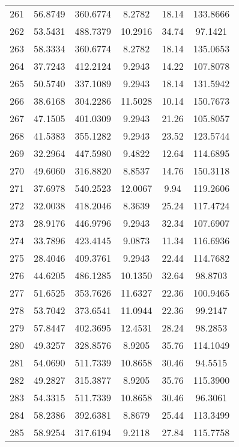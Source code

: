 \begin{center}
\begin{footnotesize}
\begin{tabular}{|c|ccccc|}
261 & 56.8749 & 360.6774 & 8.2782 & 18.14 & 133.8666 \\
262 & 53.5431 & 488.7379 & 10.2916 & 34.74 & 97.1421 \\
263 & 58.3334 & 360.6774 & 8.2782 & 18.14 & 135.0653 \\
264 & 37.7243 & 412.2124 & 9.2943 & 14.22 & 107.8078 \\
265 & 50.5740 & 337.1089 & 9.2943 & 18.14 & 131.5942 \\
266 & 38.6168 & 304.2286 & 11.5028 & 10.14 & 150.7673 \\
267 & 47.1505 & 401.0309 & 9.2943 & 21.26 & 105.8057 \\
268 & 41.5383 & 355.1282 & 9.2943 & 23.52 & 123.5744 \\
269 & 32.2964 & 447.5980 & 9.4822 & 12.64 & 114.6895 \\
270 & 49.6060 & 316.8820 & 8.8537 & 14.76 & 150.3118 \\
271 & 37.6978 & 540.2523 & 12.0067 & 9.94 & 119.2606 \\
272 & 32.0038 & 418.2046 & 8.3639 & 25.24 & 117.4724 \\
273 & 28.9176 & 446.9796 & 9.2943 & 32.34 & 107.6907 \\
274 & 33.7896 & 423.4145 & 9.0873 & 11.34 & 116.6936 \\
275 & 28.4046 & 409.3761 & 9.2943 & 22.44 & 114.7682 \\
276 & 44.6205 & 486.1285 & 10.1350 & 32.64 & 98.8703 \\
277 & 51.6525 & 353.7626 & 11.6327 & 22.36 & 100.9465 \\
278 & 53.7042 & 373.6541 & 11.0944 & 22.36 & 99.2147 \\
279 & 57.8447 & 402.3695 & 12.4531 & 28.24 & 98.2853 \\
280 & 49.3257 & 328.8576 & 8.9205 & 35.76 & 114.1049 \\
281 & 54.0690 & 511.7339 & 10.8658 & 30.46 & 94.5515 \\
282 & 49.2827 & 315.3877 & 8.9205 & 35.76 & 115.3900 \\
283 & 54.3315 & 511.7339 & 10.8658 & 30.46 & 96.3061 \\
284 & 58.2386 & 392.6381 & 8.8679 & 25.44 & 113.3499 \\
285 & 58.9254 & 317.6194 & 9.2118 & 27.84 & 115.7758 \\
\hline
\end{tabular}
\end{footnotesize}
\end{center}

